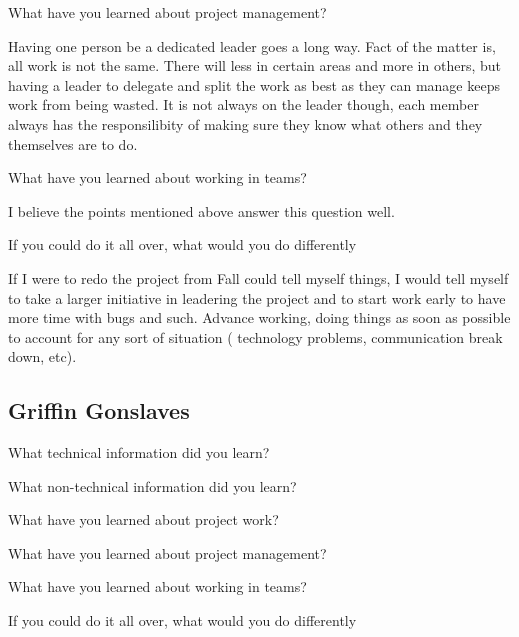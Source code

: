 \documentclass[letterpaper, 10pt, draftclsnofoot, compsoc, onecolumn]{IEEEtran}
\begin{document}
What have you learned about project management?

Having one person be a dedicated leader goes a long way. Fact of the matter is, all work is not the same. There will less in certain areas and more in others, but having a leader to delegate and split the work as best as they can manage keeps work from being wasted. It is not always on the leader though, each member always has the responsilibity of making sure they know what others and they themselves are to do.

What have you learned about working in teams?

I believe the points mentioned above answer this question well.

If you could do it all over, what would you do differently

If I were to redo the project from Fall could tell myself things, I would tell myself to take a larger initiative in leadering the project and to start work early to have more time with bugs and such. Advance working, doing things as soon as possible to account for any sort of situation ( technology problems, communication break down, etc).

\subsection{Griffin Gonslaves}
What technical information did you learn?

What non-technical information did you learn?

What have you learned about project work?

What have you learned about project management?

What have you learned about working in teams?

If you could do it all over, what would you do differently
\end{document}
